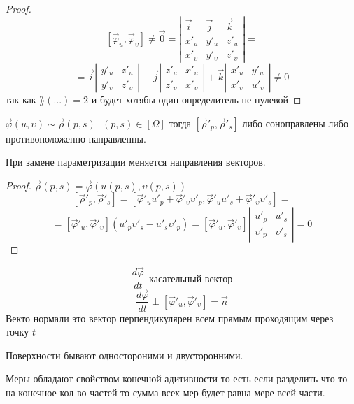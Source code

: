 \begin{proof}
  $$
  [\vec \varphi_u, \vec \varphi_{\upsilon}] \not = \vec 0 =
  \left|
  \begin{array}{ccc}
    \vec i & \vec j & \vec k \\
    x'_u & y'_u & z'_u \\
    x'_{\upsilon} & y'_{\upsilon} & z'_{\upsilon}
  \end{array}
  \right| =
  $$
  $$
  = \vec i \left|
  \begin{array}{cc}
    y'_u & z'_u \\
    y'_{\upsilon} & z'_{\upsilon}
  \end{array}
  \right| +
  \vec j \left|
  \begin{array}{cc}
    z'_u & x'_u \\
    z'_{\upsilon} & x'_{\upsilon}
  \end{array}
  \right| +
  \vec k \left|
  \begin{array}{cc}
    x'_u & y'_u \\
    x'_{\upsilon} & u'_{\upsilon}
  \end{array}
  \right| \not = 0
  $$
  так как $\rang(...) = 2$ и будет хотябы один определитель не нулевой
\end{proof}

\begin{theorem}
  $\vec \varphi(u, \upsilon) \sim \vec \rho(p,s) ~~~ (p, s) \in [\Omega]$ тогда
  $[\vec \rho'_p, \vec \rho'_s]$ либо соноправлены либо противоположенно
  направленны.

  При замене параметризации меняется направления векторов.
\end{theorem}

\begin{proof}
  $\vec \rho(p,s) = \vec \varphi(u(p,s), \upsilon(p,s))$
  $$
  [\vec \rho'_p, \vec \rho'_s] = [\vec \varphi'_u u'_p +
  \vec \varphi'_{\upsilon} \upsilon'_p, \vec \varphi'_u u'_s +
  \vec \varphi'_{\upsilon} \upsilon'_s] =
  $$
  $$
  = [\vec \varphi'_u, \vec \varphi'_{\upsilon}] (u'_p \upsilon'_s -
  u'_s \upsilon'_p) = [\vec \varphi'_u, \vec \varphi'_{\upsilon}]
  \left|
  \begin{array}{cc}
    u'_p & u'_s \\
    \upsilon'_p & \upsilon'_s
  \end{array}
  \right| = 0
  $$
\end{proof}

\begin{define}
  $$
  \frac{d \vec \varphi}{dt} ~~ \text{касательный вектор}
  $$
  $$
  \frac{d \vec \varphi}{dt} \perp [\vec \varphi'_u, \vec \varphi'_{\upsilon}]
  = \vec n
  $$
  Векто нормали это вектор перпендикулярен всем прямым проходящим через точку
  $t$

  Поверхности бывают одностороними и двусторонними.

  Меры обладают свойством конечной адитивности то есть если разделить что-то
  на конечное кол-во частей то сумма всех мер будет равна мере всей части.
\end{define}

